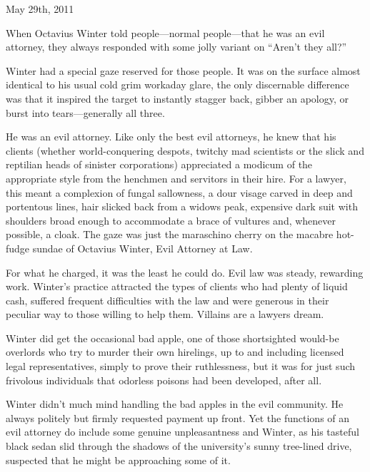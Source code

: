 \documentclass[ebook,10pt]{memoir}
\begin{document}
May 29th, 2011

\cleardoublepage



\mainmatter
\normalsize
\pagestyle{narbonic}
\thispagestyle{narbonicfirst}

When Octavius Winter told people---normal people---that he was an evil
attorney, they always responded with some jolly variant on ``Aren't
they all?''

Winter had a special gaze reserved for those people. It was on the
surface almost identical to his usual cold grim workaday glare, the
only discernable difference was that it inspired the target to
instantly stagger back, gibber an apology, or burst into
tears---generally all three.

He was an evil attorney. Like only the best evil attorneys, he knew
that his clients (whether world-conquering despots, twitchy mad
scientists or the slick and reptilian heads of sinister corporations)
appreciated a modicum of the appropriate style from the henchmen and
servitors in their hire. For a lawyer, this meant a complexion of
fungal sallowness, a dour visage carved in deep and portentous lines,
hair slicked back from a widows peak, expensive dark suit with
shoulders broad enough to accommodate a brace of vultures and,
whenever possible, a cloak. The gaze was just the maraschino cherry on
the macabre hot-fudge sundae of Octavius Winter, Evil Attorney at Law.

For what he charged, it was the least he could do. Evil law was
steady, rewarding work. Winter's practice attracted the types of
clients who had plenty of liquid cash, suffered frequent difficulties
with the law and were generous in their peculiar way to those willing
to help them. Villains are a lawyers dream. 

Winter did get the occasional bad apple, one of those shortsighted
would-be overlords who try to murder their own hirelings, up to and
including licensed legal representatives, simply to prove their
ruthlessness, but it was for just such frivolous individuals that
odorless poisons had been developed, after all.

Winter didn't much mind handling the bad apples in the evil
community. He always politely but firmly requested payment up
front. Yet the functions of an evil attorney do include some genuine
unpleasantness and Winter, as his tasteful black sedan slid through
the shadows of the university's sunny tree-lined drive, suspected that
he might be approaching some of it.
\end{document}
